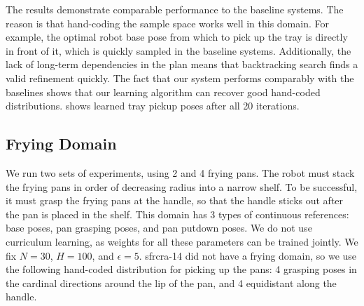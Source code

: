 The results demonstrate comparable performance to the baseline systems. The reason is that
hand-coding the sample space works well in this domain. For example, the optimal
robot base pose from which to pick up the tray is directly in front of it, which is quickly sampled in
the baseline systems. Additionally, the lack of long-term dependencies in the plan
means that backtracking search finds a valid refinement quickly. The fact that our system performs comparably
with the baselines shows that our learning algorithm can recover good hand-coded distributions.
 shows learned tray pickup poses after all 20 iterations.


\subsection{Frying Domain}
We run two sets of experiments, using 2 and 4 frying pans. The robot must stack the frying pans in order of decreasing
radius into a narrow shelf. To be successful, it must grasp the frying pans at the handle, so that the handle sticks out
after the pan is placed in the shelf. This domain has 3 types of continuous references: base poses, pan grasping poses, and
pan putdown poses. We do not use curriculum learning, as weights for all these parameters can be trained jointly.
We fix $N = 30$, $H = 100$, and $\epsilon = 5$. {\sc sfrcra-14} did not have a frying domain, so we use the following
hand-coded distribution for picking up the pans: 4 grasping poses in the cardinal directions around the lip of the pan,
and 4 equidistant along the handle.

